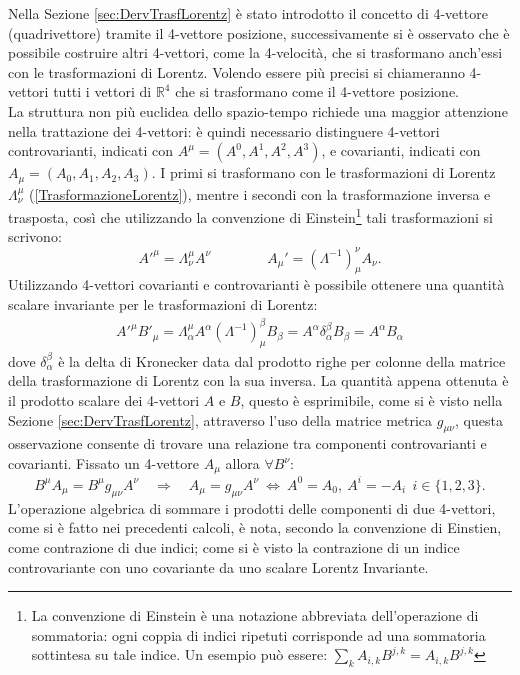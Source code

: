 
Nella Sezione \ref{sec:DervTrasfLorentz} è stato introdotto il concetto di 4-vettore (quadrivettore) tramite il 4-vettore posizione, successivamente si è osservato che è possibile costruire altri 4-vettori, come la 4-velocità, che si trasformano anch'essi con le trasformazioni di Lorentz. Volendo essere più precisi si chiameranno 4-vettori tutti i vettori di $\mathbb{R}^4$ che si trasformano come il 4-vettore posizione.\\ 
La struttura non più euclidea dello spazio-tempo richiede una maggior attenzione nella trattazione dei 4-vettori: è quindi necessario distinguere 4-vettori controvarianti, indicati con $A^{\mu}=(A^0,A^1,A^2,A^3)$, e covarianti, indicati con $A_{\mu}=(A_0,A_1,A_2,A_3)$. I primi si trasformano con le trasformazioni di Lorentz $\Lambda_\nu^\mu$ (\ref{TrasformazioneLorentz}), mentre i secondi con la trasformazione inversa e trasposta, così che utilizzando la convenzione di Einstein\footnote{La convenzione di Einstein è una notazione abbreviata dell'operazione di sommatoria: ogni coppia di indici ripetuti corrisponde ad una sommatoria sottintesa su tale indice. Un esempio può essere: $\sum_k A_{i,k}B^{j,k}= A_{i,k}B^{j,k}$} tali trasformazioni si scrivono:
\begin{equation}
    A'^\mu =\Lambda_\nu^\mu A^\nu \qquad \qquad A_\mu '=(\Lambda^{-1} )^\nu_\mu A_\nu.
\end{equation}
Utilizzando 4-vettori covarianti e controvarianti è possibile ottenere una quantità scalare invariante per le trasformazioni di Lorentz:
\begin{eqnarray*}
    A'^\mu B'_\mu=\Lambda_\alpha^\mu A^\alpha (\Lambda^{-1} )^\beta_\mu B_\beta=A^\alpha \delta_\alpha^\beta B_\beta=A^\alpha B_\alpha
\end{eqnarray*}
dove $ \delta_\alpha^\beta$ è la delta di Kronecker data dal prodotto righe per colonne della matrice della trasformazione di Lorentz con la sua inversa. La quantità appena ottenuta è il prodotto scalare dei 4-vettori $A$ e $B$, questo è esprimibile, come si è visto nella Sezione \ref{sec:DervTrasfLorentz}, attraverso l'uso della matrice metrica $g_{\mu \nu}$, questa osservazione consente di trovare una relazione tra componenti controvarianti e covarianti. Fissato un 4-vettore $A_\mu$ allora $\forall B^\nu$: 
\begin{equation}
    B^\mu A_\mu=B^\mu g_{\mu\nu} A^\nu \quad \Rightarrow\quad A_\mu=g_{\mu\nu}A^\nu \ \Leftrightarrow\ A^0=A_0,\ A^i=-A_i \ \ i\in\{1,2,3\}.
\end{equation}
L'operazione algebrica di sommare i prodotti delle componenti di due 4-vettori, come si è fatto nei precedenti calcoli, è nota, secondo la convenzione di Einstien, come contrazione di due indici; come si è visto la contrazione di un indice controvariante con uno covariante da uno scalare Lorentz Invariante.\\


